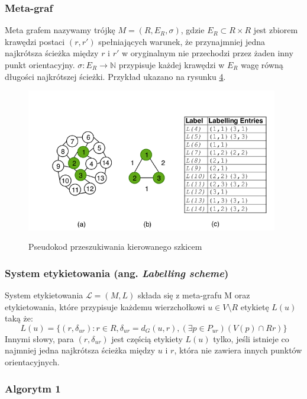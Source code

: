 \documentclass{article}
\theoremstyle{definition}
\begin{document}
        \subsubsection*{Meta-graf}
            Meta grafem nazywamy trójkę $M = (R, E_R, \sigma)$, gdzie $E_R \subset R \times R$ jest zbiorem krawędzi postaci $(r, r')$ spełniających warunek, że przynajmniej jedna najkrótsza ścieżka między $r$ i $r'$ w oryginalnym nie przechodzi przez żaden inny punkt orientacyjny. $\sigma: E_R \rightarrow \mathbb{N}$ przypisuje każdej krawędzi w $E_R$ wagę równą długości najkrótszej ścieżki. Przykład ukazano na rysunku \hyperref[fig:meta]{4}.

            \begin{figure}[!tbh]
                \includegraphics[width=11cm]{img/meta-graph.png}
                \centering
                \label{fig:meta}
                \caption{Pseudokod przeszukiwania kierowanego szkicem}
            \end{figure}

        \subsubsection*{System etykietowania (ang. \textit{Labelling scheme})}
            System etykietowania $\mathcal{L} = (M,L)$ składa się z meta-grafu M oraz etykietowania, które przypisuje każdemu wierzchołkowi $u \in V \setminus R$ etykietę $L(u)$ taką że:
            \[ 
                L(u) = \{(r, \delta_{ur}) : r \in R, \delta_{ur} = d_G(u,r), (\exists p \in P_{ur})(V(p) \cap R {r}) \}
            \]
            Innymi słowy, para $(r, \delta_{ur})$ jest częścią etykiety $L(u)$ tylko, jeśli istnieje co najmniej jedna najkrótsza ścieżka między $u$ i $r$, która nie zawiera innych punktów orientacyjnych. 

        \subsubsection*{Algorytm 1} 
\end{document}
